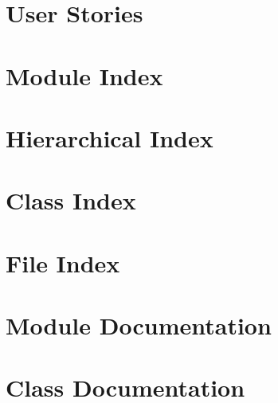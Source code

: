 \documentclass[twoside]{book}
\newcommand{\+}{\discretionary{\mbox{\scriptsize$\hookleftarrow$}}{}{}}
\begin{document}
\chapter{User Stories}
\label{md_doc_wiki__user-_stories}

\chapter{Module Index}

\chapter{Hierarchical Index}

\chapter{Class Index}

\chapter{File Index}

\chapter{Module Documentation}






\chapter{Class Documentation}














\end{document}
